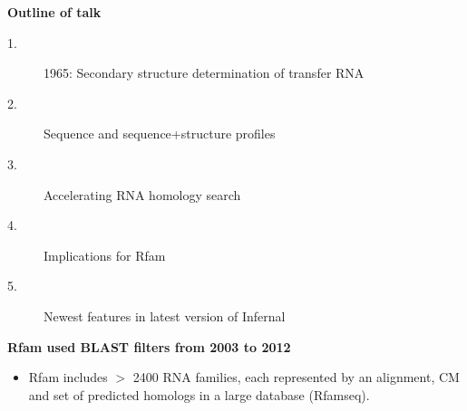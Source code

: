 \documentclass[landscape]{slides}
\begin{document}
\begin{slide}
\begin{center}
\textbf{Outline of talk}

\begin{description}
\item[1.] 1965: Secondary structure determination of transfer RNA
\item[2.] Sequence and sequence+structure profiles
\item[3.] Accelerating RNA homology search
\item[\textcolor{myorange}{4.}] \textcolor{myorange}{Implications for Rfam}
\item[5.] Newest features in latest version of Infernal
\end{description}

\end{center}
\vfill
\end{slide}
\begin{slide}
\begin{center}

\textbf{Rfam used BLAST filters from 2003 to 2012}

\end{center}

\begin{itemize}
\item Rfam includes $>$ 2400 RNA families, each represented by an
  alignment, CM and set of predicted homologs in a large database (Rfamseq).
\end{itemize}


\vfill
\end{slide}
\end{document}
